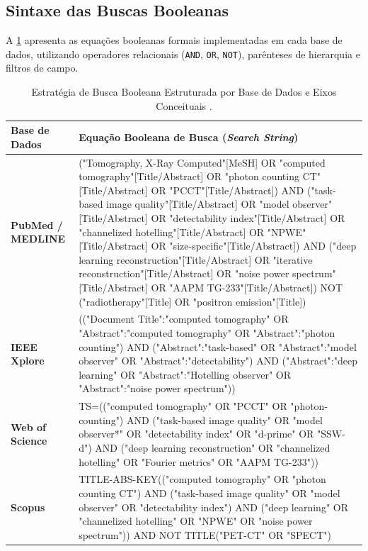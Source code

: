 \documentclass[
  12pt,
  a4paper,
  oneside
]{report}
\begin{document}
\subsection{Sintaxe das Buscas Booleanas}
\label{subsec:equacoes_booleanas_tabela}
A \cref{tab:estrategia_booleana} apresenta as equações booleanas formais implementadas em cada base de dados, utilizando operadores relacionais (\texttt{AND}, \texttt{OR}, \texttt{NOT}), parênteses de hierarquia e filtros de campo.

\begin{table}[htbp]
  \centering
  \small
  \caption[Estratégia de Busca Booleana por Base de Dados]{Estratégia de Busca Booleana Estruturada por Base de Dados e Eixos Conceituais \cite{page2021}.}
  \label{tab:estrategia_booleana}
  \renewcommand{\arraystretch}{1.25}
  \begin{tabularx}{\textwidth}{>{\RaggedRight\bfseries}p{} >{\RaggedRight\footnotesize\ttfamily\arraybackslash}X}
    \toprule
    \textbf{Base de Dados} & \textbf{Equação Booleana de Busca (\emph{Search String})} \\
    \midrule
    PubMed / MEDLINE & 
    ("Tomography, X-Ray Computed"[MeSH] OR "computed tomography"[Title/Abstract] OR "photon counting CT"[Title/Abstract] OR "PCCT"[Title/Abstract]) AND ("task-based image quality"[Title/Abstract] OR "model observer"[Title/Abstract] OR "detectability index"[Title/Abstract] OR "channelized hotelling"[Title/Abstract] OR "NPWE"[Title/Abstract] OR "size-specific"[Title/Abstract]) AND ("deep learning reconstruction"[Title/Abstract] OR "iterative reconstruction"[Title/Abstract] OR "noise power spectrum"[Title/Abstract] OR "AAPM TG-233"[Title/Abstract]) NOT ("radiotherapy"[Title] OR "positron emission"[Title]) \\
    \addlinespace[0.4em]
    IEEE Xplore & 
    (("Document Title":"computed tomography" OR "Abstract":"computed tomography" OR "Abstract":"photon counting") AND ("Abstract":"task-based" OR "Abstract":"model observer" OR "Abstract":"detectability") AND ("Abstract":"deep learning" OR "Abstract":"Hotelling observer" OR "Abstract":"noise power spectrum")) \\
    \addlinespace[0.4em]
    Web of Science & 
    TS=(("computed tomography" OR "PCCT" OR "photon-counting") AND ("task-based image quality" OR "model observer*" OR "detectability index" OR "d-prime" OR "SSW-d") AND ("deep learning reconstruction" OR "channelized hotelling" OR "Fourier metrics" OR "AAPM TG-233")) \\
    \addlinespace[0.4em]
    Scopus & 
    TITLE-ABS-KEY(("computed tomography" OR "photon counting CT") AND ("task-based image quality" OR "model observer" OR "detectability index") AND ("deep learning" OR "channelized hotelling" OR "NPWE" OR "noise power spectrum")) AND NOT TITLE("PET-CT" OR "SPECT") \\
    \bottomrule
  \end{tabularx}
  \vspace{0.3em}\par{}
\end{table}
\end{document}

